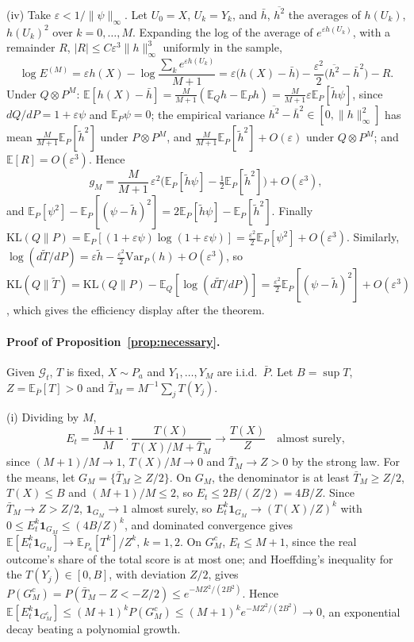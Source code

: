 \documentclass[11pt]{article}
\newcommand{\E}{\mathbb{E}}
\newcommand{\KL}{\mathrm{KL}}
\newcommand{\G}{\mathcal{G}}
\theoremstyle{remark}
\begin{document}
(iv) Take $\varepsilon < 1/\|\psi\|_\infty$. Let $U_0 = X$, $U_k = Y_k$, and
$\bar h$, $\overline{h^2}$ the averages of $h(U_k)$, $h(U_k)^2$ over
$k = 0, \ldots, M$. Expanding the log of the average of $e^{\varepsilon h(U_k)}$,
with a remainder $R$, $|R| \le C\varepsilon^3\|h\|_\infty^3$ uniformly in the sample,
\[
\log E^{(M)} = \varepsilon h(X) - \log\frac{\sum_k e^{\varepsilon h(U_k)}}{M+1}
= \varepsilon\big(h(X) - \bar h\big) - \frac{\varepsilon^2}{2}\big(\overline{h^2} - \bar h^2\big) - R .
\]
Under $Q \otimes P^M$: $\E[h(X) - \bar h] = \frac{M}{M+1}(\E_Q h - \E_P h)
= \frac{M}{M+1}\varepsilon\E_P[\tilde h\psi]$, since $dQ/dP = 1+\varepsilon\psi$
and $\E_P\psi = 0$; the empirical variance $\overline{h^2} - \bar h^2 \in [0, \|h\|_\infty^2]$
has mean $\frac{M}{M+1}\E_P[\tilde h^2]$ under $P \otimes P^M$, and
$\frac{M}{M+1}\E_P[\tilde h^2] + O(\varepsilon)$ under $Q \otimes P^M$; and
$\E[R] = O(\varepsilon^3)$. Hence
\[
g_M = \frac{M}{M+1}\,\varepsilon^2\Big(\E_P[\tilde h\psi] - \tfrac12\E_P[\tilde h^2]\Big) + O(\varepsilon^3),
\]
and $\E_P[\psi^2] - \E_P[(\psi - \tilde h)^2] = 2\E_P[\tilde h\psi] - \E_P[\tilde h^2]$.
Finally $\KL(Q\|P) = \E_P[(1 + \varepsilon\psi)\log(1 + \varepsilon\psi)]
= \frac{\varepsilon^2}{2}\E_P[\psi^2] + O(\varepsilon^3)$. Similarly,
$\log(d\tilde T/dP) = \varepsilon\tilde h - \frac{\varepsilon^2}{2}\mathrm{Var}_P(h)
+ O(\varepsilon^3)$, so
$\KL(Q\|\tilde T) = \KL(Q\|P) - \E_Q[\log(d\tilde T/dP)]
= \frac{\varepsilon^2}{2}\E_P[(\psi - \tilde h)^2] + O(\varepsilon^3)$, which
gives the efficiency display after the theorem.

\paragraph{Proof of Proposition~\ref{prop:necessary}.}
Given $\G_t$, $T$ is fixed, $X \sim P_a$ and $Y_1, \ldots, Y_M$ are i.i.d.\
$\bar P$. Let $B = \sup T$, $Z = \E_{\bar P}[T] > 0$ and
$\bar T_M = M^{-1}\sum_j T(Y_j)$.

(i) Dividing by $M$,
\[
E_t = \frac{M+1}{M}\cdot\frac{T(X)}{T(X)/M + \bar T_M} \to \frac{T(X)}{Z}
\quad\text{almost surely},
\]
since $(M+1)/M \to 1$, $T(X)/M \to 0$ and $\bar T_M \to Z > 0$ by the strong law.
For the means, let $G_M = \{\bar T_M \ge Z/2\}$. On $G_M$, the denominator is at
least $\bar T_M \ge Z/2$, $T(X) \le B$ and $(M+1)/M \le 2$, so
$E_t \le 2B/(Z/2) = 4B/Z$. Since $\bar T_M \to Z > Z/2$,
$\mathbf 1_{G_M} \to 1$ almost surely, so $E_t^k\mathbf 1_{G_M} \to (T(X)/Z)^k$
with $0 \le E_t^k\mathbf 1_{G_M} \le (4B/Z)^k$, and dominated convergence gives
$\E[E_t^k\mathbf 1_{G_M}] \to \E_{P_a}[T^k]/Z^k$, $k = 1, 2$. On $G_M^c$, $E_t \le M+1$, since the real outcome's
share of the total score is at most one; and Hoeffding's inequality
\citep{hoeffding1963probability} for the $T(Y_j) \in [0, B]$, with deviation
$Z/2$, gives $P(G_M^c) = P(\bar T_M - Z < -Z/2) \le e^{-MZ^2/(2B^2)}$. Hence
$\E[E_t^k\mathbf 1_{G_M^c}] \le (M+1)^k P(G_M^c) \le (M+1)^k e^{-MZ^2/(2B^2)} \to 0$,
an exponential decay beating a polynomial growth.
\end{document}
